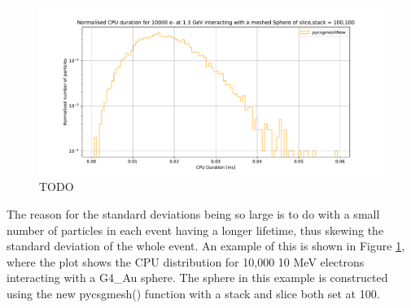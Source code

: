 \documentclass[12pt,a4paper]{article}
\begin{document}

\begin{figure}[h!]
\centering
\includegraphics[scale=0.5]{Images//CPU//pythonhist1.pdf}
\caption[width=\columnwidth]{TODO}
\label{disty}
\end{figure}

\noindent The reason for the standard deviations being so large is to do with a small number of particles in each event having a longer lifetime, thus skewing the standard deviation of the whole event. An example of this is shown in Figure \ref{disty}, where the plot shows the CPU distribution for 10,000 10 MeV electrons interacting with a G4\_Au sphere. The sphere in this example is constructed using the new pycsgmesh() function with a stack and slice both set at 100.
\end{document}
